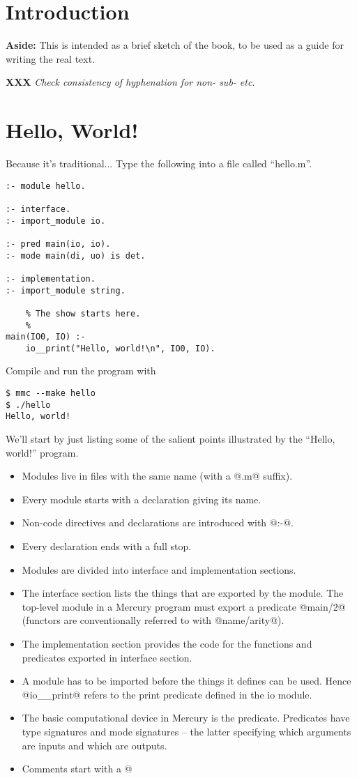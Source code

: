 \documentclass[a4paper,11pt,notitlepage,onecolumn]{article}
\newcommand{\XXX}[1]%
{{\small\textbf{XXX} \emph{#1}}}
\newcommand{\Aside}[1]%
{{\small{\begin{description}\item{\textbf{Aside:}} #1\end{description}}}}
\begin{document}
\section{Introduction}

\Aside{This is intended as a brief sketch of the book, to be used as a guide
for writing the real text.}

\XXX{Check consistency of hyphenation for non- sub- etc.}



\section{Hello, World!}

Because it's traditional...  Type the following into a file called
``hello.m''.
\begin{verbatim}
:- module hello.

:- interface.
:- import_module io.

:- pred main(io, io).
:- mode main(di, uo) is det.

:- implementation.
:- import_module string.

    % The show starts here.
    %
main(IO0, IO) :-
    io__print("Hello, world!\n", IO0, IO).
\end{verbatim}
Compile and run the program with
\begin{verbatim}
$ mmc --make hello
$ ./hello
Hello, world!
\end{verbatim}
We'll start by just listing some of the salient points illustrated
by the ``Hello, world!'' program.
\begin{itemize}
\item Modules live in files with the same name (with a @.m@ suffix).
\item Every module starts with a declaration giving its name.
\item Non-code directives and declarations are introduced with @:-@.
\item Every declaration ends with a full stop.
\item Modules are divided into interface and implementation sections.
\item The interface section lists the things that are exported by the
  module.  The top-level module in a Mercury program must export a
  predicate @main/2@ (functors are conventionally referred to with
  @name/arity@).
\item The implementation section provides the code for the functions
  and predicates exported in interface section.
\item A module has to be imported before the things it defines can be
  used.  Hence @io__print@ refers to the print predicate defined in
  the io module.
\item The basic computational device in Mercury is the predicate.
  Predicates have type signatures and mode signatures -- the latter
  specifying which arguments are inputs and which are outputs.
\item Comments start with a @%
\end{itemize}
\end{document}
